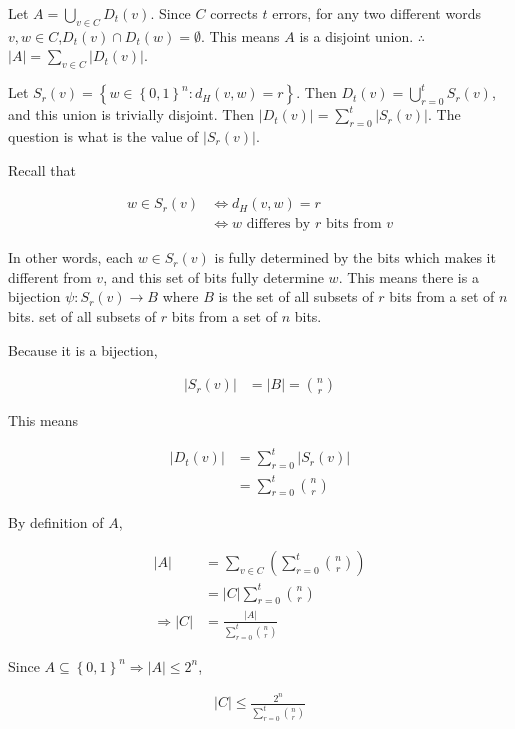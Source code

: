 \documentclass[a4paper, 12pt]{article}
\begin{document}
Let $A = \bigcup_{v \in C} D_t(v)$. Since $C$ corrects $t$ errors, for any two 
different words $v, w \in C$,$ D_t(v) \cap D_t(w) = \emptyset$. This means $A$
is a disjoint union. $\therefore $ $|A| = \sum_{v \in C} |D_t(v)|$.

Let $S_r(v) = \left\{ w \in \left\{ 0, 1 \right\}^n : d_H(v, w) = r \right\} $.
Then $D_t(v) = \bigcup_{r=0}^{t}S_r(v)$, and this union is trivially disjoint.
Then $|D_t(v)| = \sum_{r = 0}^{t} |S_r(v)|$. The question is what is the value
of $|S_r(v)|$.

Recall that

\begin{align*}
    w \in S_r(v) &\iff d_H(v, w) = r \\ 
          &\iff w \text{ differes by $r$ bits from } v
\end{align*}

In other words, each $w \in S_r(v)$ is fully determined by the 
bits which makes it different from $v$, and this set of bits 
fully determine $w$. This means there is a bijection $\psi : S_r(v) \to B$ where 
$B$ is the set of all subsets of $r$ bits from a set of $n$ bits.
set of all subsets of $r$  bits from a set of $n$ bits.

Because it is a bijection,


\begin{align*}
    |S_r(v)| &= |B| = \binom{n}{r}
\end{align*}

This means

    \begin{align*}
        |D_t(v)| &= \sum_{r=0}^{t} |S_r(v)| \\ 
                 &= \sum_{r=0}^{t} \binom{n}{r}
    \end{align*}

By definition of $A$,

    \begin{align*}
        |A| &= \sum_{v \in C} \left( \sum_{r=0}^{t} \binom{n}{r} \right) \\ 
            &= |C| \sum_{r=0}^{t} \binom{n}{r}\\
        \Rightarrow |C| &=  \frac{|A|}{\sum_{r=0}^{t} \binom{n}{r}}
    \end{align*}

    Since $A \subseteq \left\{ 0,1 \right\}^n \Rightarrow |A| \leq 2^n $, 

    \begin{align*}
        |C| \leq \frac{2^n}{\sum_{r=0}^{t} \binom{n}{r}}
    \end{align*}
\end{document}
